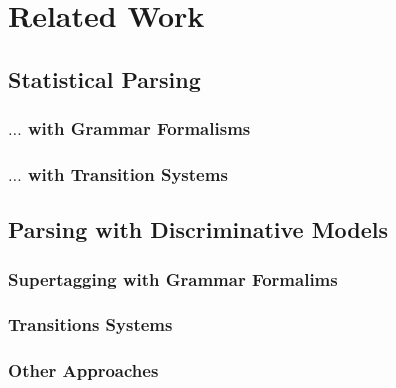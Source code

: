 \documentclass[../document.tex]{subfiles}
\begin{document}
    \chapter{Related Work}\label{sec:literature}
    \section{Statistical Parsing}
    \subsection{$\ldots$ with Grammar Formalisms}
    \subsection{$\ldots$ with Transition Systems}
    \section{Parsing with Discriminative Models}
    \subsection{Supertagging with Grammar Formalims}
    \subsection{Transitions Systems}
    \subsection{Other Approaches}
\end{document}
